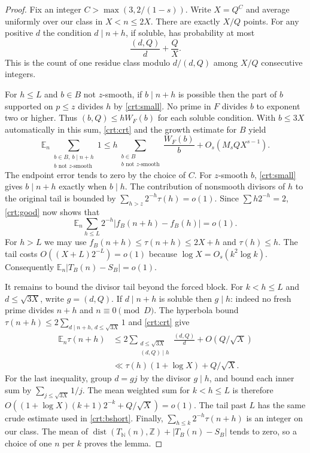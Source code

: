 \documentclass[11pt,letterpaper]{article}
\newcommand{\Z}{\mathbb Z}
\newcommand{\N}{\mathbb N}
\newcommand{\E}{\mathbb E}
\newcommand{\dist}{\operatorname{dist}}
\begin{document}
\begin{proof}
Fix an integer $C>\max(3,2/(1-s))$. Write $X=Q^C$ and average uniformly over our class in $X<n\le2X$. There are exactly $X/Q$ points. For any positive $d$ the condition $d\mid n+h$, if soluble, has probability at most
\begin{equation}\label{crt:crt}
 \frac{(d,Q)}{d}+\frac QX.
\end{equation}
This is the count of one residue class modulo $d/(d,Q)$ among $X/Q$ consecutive integers.

For $h\le L$ and $b\in B$ not $z$-smooth, if $b\mid n+h$ is possible then the part of $b$ supported on $p\le z$ divides $h$ by \eqref{crt:small}. No prime in $F$ divides $b$ to exponent two or higher. Thus $(b,Q)\le h W_F(b)$ for each soluble condition. With $b\le 3X$ automatically in this sum, \eqref{crt:crt} and the growth estimate for $B$ yield
\[
 \E_n\sum_{\substack{b\in B,\ b\mid n+h\\b\text{ not }z\text{-smooth}}}1
 \le h\sum_{\substack{b\in B\\b\text{ not }z\text{-smooth}}}\frac{W_F(b)}{b}
   +O_s(M_s Q X^{s-1}).
\]
The endpoint error tends to zero by the choice of $C$. For $z$-smooth $b$, \eqref{crt:small} gives $b\mid n+h$ exactly when $b\mid h$. The contribution of nonsmooth divisors of $h$ to the original tail is bounded by $\sum_{h>z}2^{-h}\tau(h)=o(1)$. Since $\sum h2^{-h}=2$, \eqref{crt:good} now shows that
\begin{equation}\label{crt:bshort}
 \E_n\sum_{h\le L}2^{-h}|f_B(n+h)-f_B(h)|=o(1).
\end{equation}
For $h>L$ we may use $f_B(n+h)\le\tau(n+h)\le2X+h$ and $\tau(h)\le h$. The tail costs $O((X+L)2^{-L})=o(1)$ because $\log X=O_s(k^2\log k)$. Consequently $\E_n|T_B(n)-S_B|=o(1)$.

It remains to bound the divisor tail beyond the forced block. For $k<h\le L$ and $d\le\sqrt{3X}$, write $g=(d,Q)$. If $d\mid n+h$ is soluble then $g\mid h$: indeed no fresh prime divides $n+h$ and $n\equiv0\pmod D$. The hyperbola bound $\tau(n+h)\le2\sum_{d\mid n+h,\,d\le\sqrt{3X}}1$ and \eqref{crt:crt} give
\begin{align*}
 \E_n\tau(n+h)
 &\le 2\sum_{\substack{d\le\sqrt{3X}\\(d,Q)\mid h}}\frac{(d,Q)}{d}
   +O(Q/\sqrt X)\\
 &\ll \tau(h)(1+\log X)+Q/\sqrt X .
\end{align*}
For the last inequality, group $d=g j$ by the divisor $g\mid h$, and bound each inner sum by $\sum_{j\le\sqrt{3X}}1/j$. The mean weighted sum for $k<h\le L$ is therefore $O((1+\log X)(k+1)2^{-k}+Q/\sqrt X)=o(1)$. The tail past $L$ has the same crude estimate used in \eqref{crt:bshort}. Finally, $\sum_{h\le k}2^{-h}\tau(n+h)$ is an integer on our class. The mean of $\dist(T_{\N}(n),\Z)+|T_B(n)-S_B|$ tends to zero, so a choice of one $n$ per $k$ proves the lemma.
\end{proof}
\end{document}

